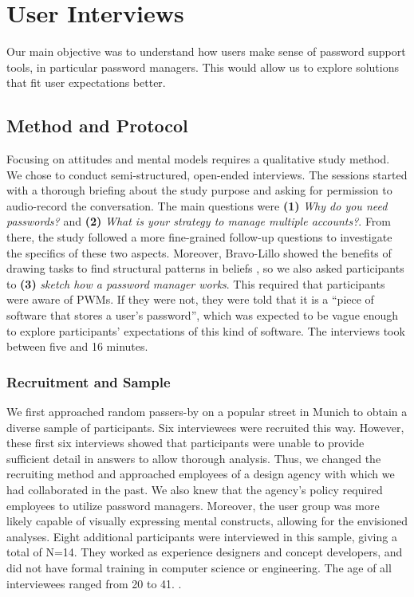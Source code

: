 \cite{Kang2015MentalModelsDrawing} \cite{BravoLillo2011WarningsMentalModel}



\section{User Interviews}
Our main objective was to understand how users make sense of password support tools, in particular password managers. This would allow us to explore solutions that fit user expectations better. 

\subsection{Method and Protocol}
Focusing on attitudes and mental models requires a qualitative study method. We chose to conduct semi-structured, open-ended interviews. The sessions started with a thorough briefing about the study purpose and asking for permission to audio-record the conversation. The main questions were \textbf{(1)} \textit{Why do you need passwords?} and \textbf{(2)} \textit{What is your strategy to manage multiple accounts?}. From there, the study followed a more fine-grained follow-up questions to investigate the specifics of these two aspects. Moreover, Bravo-Lillo \etal showed the benefits of drawing tasks to find structural patterns in beliefs \cite{BravoLillo2011WarningsMentalModel}, so we also asked participants to \textbf{(3)} \textit{sketch how a password manager works}. This required that participants were aware of \glspl{PWM}. If they were not, they were told that it is a ``piece of software that stores a user's password'', which was expected to be vague enough to explore participants' expectations of this kind of software. The interviews took between five and 16 minutes. 

\subsubsection{Recruitment and Sample}
We first approached random passers-by on a popular street in Munich to obtain a diverse sample of participants. Six interviewees were recruited this way. However, these first six interviews showed that participants were unable to provide sufficient detail in answers to allow thorough analysis. Thus, we changed the recruiting method and approached employees of a design agency with which we had collaborated in the past. We also knew that the agency's policy required employees to utilize password managers. Moreover, the user group was more likely capable of visually expressing mental constructs, allowing for the envisioned analyses. Eight additional participants were interviewed in this sample, giving a total of N=14. They worked as experience designers and concept developers, and did not have formal training in computer science or engineering. The age of all interviewees ranged from 20 to 41. . 

